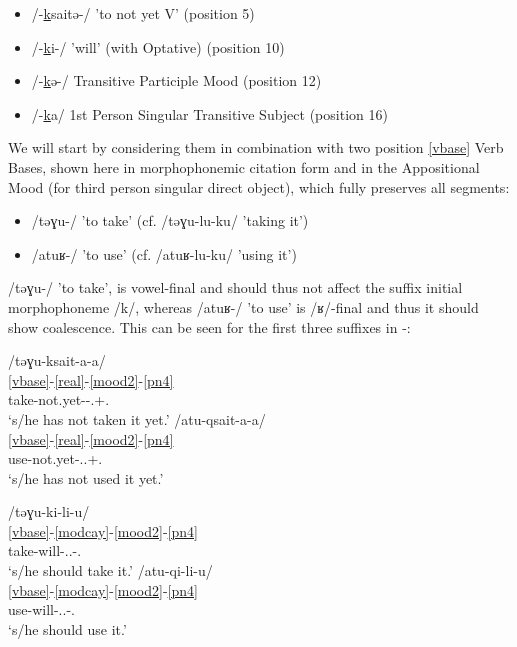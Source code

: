 \documentclass[output=paper]{langscibook}
\begin{document}
\begin{itemize}
\item 
/-\ul{k}saitǝ-/ 'to not yet V' (position 5)
\item 
/-\ul{k}i-/ 'will' (with Optative) (position 10)
\item 
/-\ul{k}ǝ-/ Transitive Participle Mood (position 12)
\item 
/-\ul{k}a/ 1st Person Singular Transitive Subject (position 16)
\end{itemize}

We will start by considering them in combination with two position \ref{vbase} Verb Bases, shown here in morphophonemic citation form and in the Appositional Mood (for third person singular direct object), which fully preserves all segments:

\begin{itemize}
\item 
/tǝɣu-/ 'to take' (cf. /tǝɣu-lu-ku/ 'taking it')
\item 
/atuʁ-/ 'to use' (cf. /atuʁ-lu-ku/ 'using it')
\end{itemize}

/tǝɣu-/ 'to take', is vowel-final and should thus not affect the suffix initial morphophoneme /k/, whereas /atuʁ-/ 'to use' is /ʁ/-final and thus it should show coalescence. This can be seen for the first three suffixes in -:

\ea\label{ex:key:43}
\ea\label{ex:key:43a}\glll /tǝɣu-ksait-a-a/\\
    \ref{vbase}-\ref{real}-\ref{mood2}-\ref{pn4} \\
     take-not.yet-\Ind{}-\Tsg.\Aarg{}+\Tsg.\Obj{}\\
\glt {}`s/he has not taken it yet.'
\ex\label{ex:key:43b}
\glll /atu{}-qsait-a{}-a/\\
    \ref{vbase}-\ref{real}-\ref{mood2}-\ref{pn4} \\
     use-not.yet-\Ind{}.\Tsg.\Aarg{}+\Tsg.\Obj{}\\
\glt {}`s/he has not used it yet.'
\z
\z

\ea\label{ex:key:44}
\ea\label{ex:key:44a}\glll /tǝɣu-ki-li-u/\\
    \ref{vbase}-\ref{modcay}-\ref{mood2}-\ref{pn4} \\
     take-will-\Opt.\Tsg.\Aarg{}-\Tsg.\Obj{}\\
\glt {}`s/he should take it.'
\ex\label{ex:key:44b}
\glll /atu{}-qi-li-u/\\
    \ref{vbase}-\ref{modcay}-\ref{mood2}-\ref{pn4} \\
     use-will-\Opt.\Tsg.\Aarg{}-\Tsg.\Obj{}\\
\glt {}`s/he should use it.'
\z
\z
\end{document}
